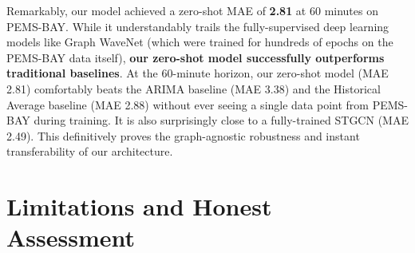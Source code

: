 \documentclass[11pt, a4paper]{article}
\begin{document}
\begin{table}[H]
\centering
\caption{Zero-Shot Spatial Transferability on PEMS-BAY. $^\dagger$Published supervised models trained from scratch on PEMS-BAY (hundreds of epochs). Our model was transferred directly from METR-LA with zero training on PEMS-BAY.}
\label{tab:transferability}
\end{table}

Remarkably, our model achieved a zero-shot MAE of \textbf{2.81} at 60 minutes on PEMS-BAY. While it understandably trails the fully-supervised deep learning models like Graph WaveNet (which were trained for hundreds of epochs on the PEMS-BAY data itself), \textbf{our zero-shot model successfully outperforms traditional baselines}. At the 60-minute horizon, our zero-shot model (MAE 2.81) comfortably beats the ARIMA baseline (MAE 3.38) and the Historical Average baseline (MAE 2.88) without ever seeing a single data point from PEMS-BAY during training. It is also surprisingly close to a fully-trained STGCN (MAE 2.49). This definitively proves the graph-agnostic robustness and instant transferability of our architecture.

\section{Limitations and Honest Assessment}
\label{sec:limitations}
\end{document}
